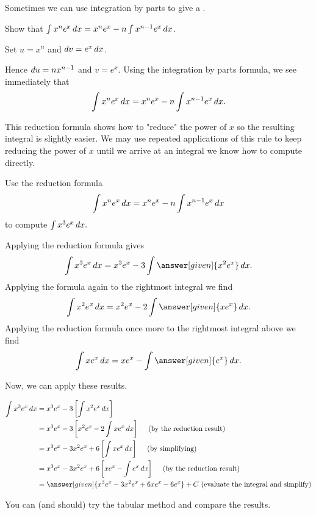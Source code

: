 \documentclass[noauthor]{ximera}
\begin{document}
Sometimes we can use integration by parts to give a .

\begin{example}
  Show that $  \int x^n e^x \mathop{}\!d x = x^n e^x -n \int x^{n-1} e^x\mathop{}\!d x$.
  \begin{explanation}
   Set $u= x^n$ and $\mathop{}\!d v = e^x \mathop{}\!d x$. 
   
   Hence $\mathop{}\!d u = n x^{n-1}$ and $v = e^x$. Using the
    integration by parts formula, we see immediately that
    \[
    \int x^n e^x \mathop{}\!d x = x^n e^x -n \int x^{n-1} e^x \mathop{}\!d x.
    \]
  \end{explanation}
\end{example}

This reduction formula shows how to "reduce" the power of $x$ so the resulting integral is slightly easier. We may use repeated applications of this rule to keep reducing the power of $x$ until we arrive at an integral we know how to compute directly. 

\begin{example}
  Use the reduction formula
  \[
  \int x^n e^x \mathop{}\!d x = x^n e^x -n \int x^{n-1} e^x\mathop{}\!d x
  \]
  to compute $\int x^3 e^x \mathop{}\!d x.$
  
  \begin{explanation}
  Applying the reduction formula gives
    \[
    \int x^3 e^x \d x = x^3e^x -3\int \answer[given]{x^2 e^x}\d x.
    \]
    Applying the formula again to the rightmost integral we find
    \[
    \int x^{2} e^x\d x = x^2e^x - 2 \int \answer[given]{x e^x}\d x.
    \]
    Applying the reduction formula once more to the rightmost integral above we find
    \[
    \int x e^x\d x =xe^x - \int \answer[given]{e^x}\d x.
    \]

Now, we can apply these results.

\begin{align*}
        \int x^3 e^x \d x& = x^3e^x -3 \left[\int x^2 e^x\d x\right] \\
    &= x^3e^x -3 \left[    x^2e^x - 2 \int x e^x\d x     \right] \quad \textrm{ (by the reduction result)} \\
    &= x^3e^x - 3x^2e^x+6\left[ \int xe^x \d x \right] \quad \textrm{ (by simplifying)} \\
    &= x^3e^x - 3x^2e^x+6\left[ xe^x - \int  e^x \d x \right] \quad \textrm{ (by the reduction result)} \\
    & = \answer[given]{x^3e^x - 3x^2e^x+6 xe^x -6e^x} +C \textrm{ (evaluate the integral and simplify)}
\end{align*}

You can (and should) try the tabular method and compare the results.  
  \end{explanation}
\end{example}
\end{document}
